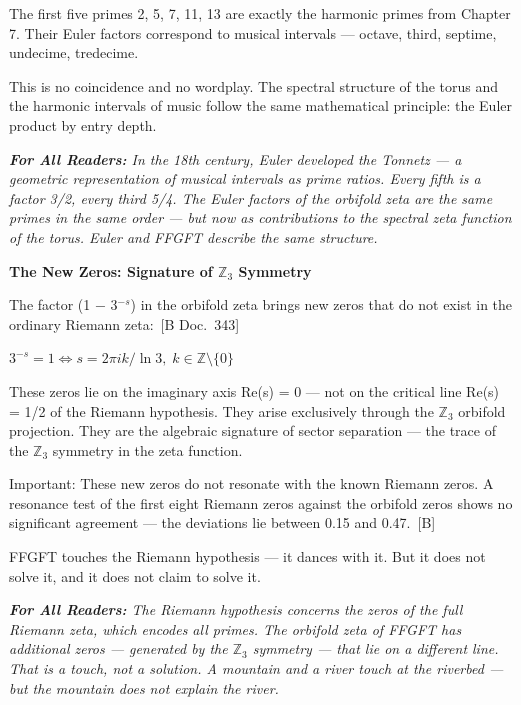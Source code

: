 \documentclass[11pt,oneside]{book}
\newcommand{\status}[1]{\penalty10000\,{\scriptsize\textcolor{gray!60}{[#1]}}}
\newenvironment{laierspur}{%
  \par\vspace{4pt}%
  \noindent\small\itshape\color{blue!60!black}%
  \textbf{For All Readers:}\enspace\ignorespaces}{%
  \par\vspace{4pt}\normalsize\normalfont\normalcolor}
\begin{document}
The first five primes {2, 5, 7, 11, 13} are exactly the harmonic primes from
Chapter 7. Their Euler factors correspond to musical intervals — octave,
third, septime, undecime, tredecime.

This is no coincidence and no wordplay. The spectral structure of the torus
and the harmonic intervals of music follow the same mathematical principle:
the Euler product by entry depth.

\begin{laierspur}
In the 18th century, Euler developed the Tonnetz — a geometric
representation of musical intervals as prime ratios. Every fifth is a factor
3/2, every third 5/4. The Euler factors of the orbifold zeta are the same
primes in the same order — but now as contributions to the spectral zeta
function of the torus. Euler and FFGFT describe the same structure.
\end{laierspur}

\textbf{The New Zeros: Signature of $\mathbb{Z}_3$ Symmetry}

The factor (1 $-$ 3$^{-s}$) in the orbifold zeta brings new zeros that do not
exist in the ordinary Riemann zeta: \status{B Doc.~343}

$3^{-s} = 1 \Longleftrightarrow s = 2\pi i k/\ln 3,\; k \in \mathbb{Z}\setminus\{0\}$

These zeros lie on the imaginary axis Re(s) = 0 — not on the critical line
Re(s) = 1/2 of the Riemann hypothesis. They arise exclusively through the
$\mathbb{Z}_3$ orbifold projection. They are the algebraic signature of sector
separation — the trace of the $\mathbb{Z}_3$ symmetry in the zeta function.

Important: These new zeros do not resonate with the known Riemann zeros. A
resonance test of the first eight Riemann zeros against the orbifold zeros
shows no significant agreement — the deviations lie between 0.15 and 0.47. \status{B}

FFGFT touches the Riemann hypothesis — it dances with it. But it does not
solve it, and it does not claim to solve it.

\begin{laierspur}
The Riemann hypothesis concerns the zeros of the full Riemann zeta, which
encodes all primes. The orbifold zeta of FFGFT has additional zeros —
generated by the $\mathbb{Z}_3$ symmetry — that lie on a different line. That is a
touch, not a solution. A mountain and a river touch at the riverbed — but
the mountain does not explain the river.
\end{laierspur}
\end{document}
